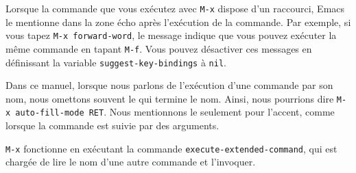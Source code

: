 Lorsque la commande que vous exécutez avec \texttt{M-x} dispose d'un
raccourci, Emacs le mentionne dans la zone écho après l'exécution de
la commande. Par exemple, si vous tapez \texttt{M-x forward-word}, le
message indique que vous pouvez exécuter la même commande en tapant
\texttt{M-f}. Vous pouvez désactiver ces messages en définissant la
variable \texttt{suggest-key-bindings} à \texttt{nil}.

Dans ce manuel, lorsque nous parlons de l'exécution d'une commande par
son nom, nous omettons souvent le \RET qui termine le nom. Ainsi, nous
pourrions dire \texttt{M-x auto-fill-mode RET}. Nous mentionnons le
\RET seulement pour l'accent, comme lorsque la commande est suivie par
des arguments. 

\texttt{M-x} fonctionne en exécutant la commande
\texttt{execute-extended-command}, qui est chargée de lire le nom d'une
autre commande et l'invoquer.

